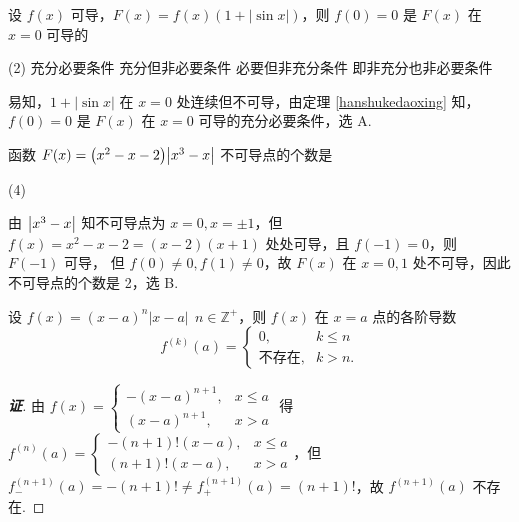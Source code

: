 \begin{example}[1995 数一]
    设 $f(x)$ 可导，$F(x)=f(x)(1+|\sin x|)$，则 $f(0)=0$ 是 $F(x)$ 在 $x=0$ 可导的
    \begin{tasks}(2)
        \task 充分必要条件
        \task 充分但非必要条件
        \task 必要但非充分条件
        \task 即非充分也非必要条件
    \end{tasks}
\end{example}
\begin{solution}
    易知，$1+|\sin x|$ 在 $x=0$ 处连续但不可导，由定理 \ref{hanshukedaoxing} 知，$f(0)=0$ 是 $F(x)$ 在 $x=0$ 可导的充分必要条件，选 A.
\end{solution}

\begin{example}[1998 数二]
    函数 $ F(x)=\qty(x^2-x-2)\qty|x^3-x| $ 不可导点的个数是
    \begin{tasks}(4)
    \end{tasks}
\end{example}
\begin{solution}
    由 $\qty|x^3-x|$ 知不可导点为 $x=0,x=\pm1$，但 $f(x)=x^2-x-2=(x - 2) (x + 1)$ 处处可导，且 $f(-1)=0$，则 $F(-1)$ 可导，
    但 $f(0)\neq 0,f(1)\neq 0$，故 $F(x)$ 在 $x=0,1$ 处不可导，因此不可导点的个数是 2，选 B.
\end{solution}



\begin{theorem}
    设 $f(x)=(x-a)^{n}|x-a|~~n\in\mathbb{Z}^{+}$，则 $f(x)$ 在 $x=a$ 点的各阶导数 $$f^{(k)}(a)=\begin{cases}
        0,&k\leqslant n\\\text{不存在},&k>n.
    \end{cases}$$
\end{theorem}
\begin{proof}[{\songti \textbf{证}}]
    由 $f(x)=\begin{cases}
        -(x-a)^{n+1},&x\leqslant a\\(x-a)^{n+1},&x>a
    \end{cases}$ 得 $f^{(n)}(a)=\begin{cases}
        -(n+1)!(x-a),&x\leqslant a\\ (n+1)!(x-a),&x>a
    \end{cases}$，但 $f^{(n+1)}_-(a)=-(n+1)!\neq f^{(n+1)}_+(a)=(n+1)!$，故 $f^{(n+1)}(a)$ 不存在.
\end{proof}

